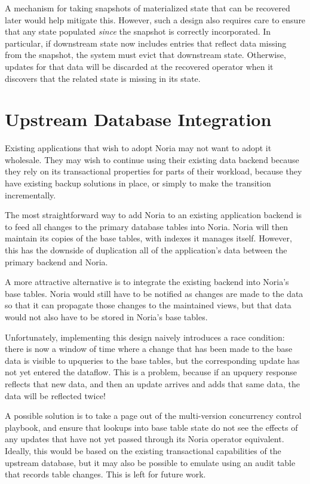 A mechanism for taking snapshots of materialized state that can be recovered
later would help mitigate this. However, such a design also requires care to
ensure that any state populated \emph{since} the snapshot is correctly
incorporated. In particular, if downstream state now includes entries that
reflect data missing from the snapshot, the system must evict that downstream
state. Otherwise, updates for that data will be discarded at the recovered
operator when it discovers that the related state is missing in its state.

\section{Upstream Database Integration}

Existing applications that wish to adopt Noria may not want to adopt it
wholesale. They may wish to continue using their existing data backend because
they rely on its transactional properties for parts of their workload, because
they have existing backup solutions in place, or simply to make the transition
incrementally.

The most straightforward way to add Noria to an existing application backend is
to feed all changes to the primary database tables into Noria. Noria will then
maintain its copies of the base tables, with indexes it manages itself. However,
this has the downside of duplication all of the application's data between the
primary backend and Noria.

A more attractive alternative is to integrate the existing backend into Noria's
base tables. Noria would still have to be notified as changes are made to the
data so that it can propagate those changes to the maintained views, but that
data would not also have to be stored in Noria's base tables.

Unfortunately, implementing this design naively introduces a race condition:
there is now a window of time where a change that has been made to the base data
is visible to upqueries to the base tables, but the corresponding update has not
yet entered the dataflow. This is a problem, because if an upquery response
reflects that new data, and then an update arrives and adds that same data, the
data will be reflected twice!

A possible solution is to take a page out of the multi-version concurrency
control playbook, and ensure that lookups into base table state do not see the
effects of any updates that have not yet passed through its Noria operator
equivalent. Ideally, this would be based on the existing transactional
capabilities of the upstream database, but it may also be possible to emulate
using an audit table that records table changes. This is left for future work.

